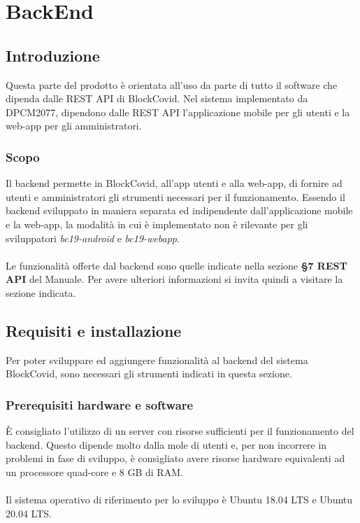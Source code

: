 \section{BackEnd}
\subsection{Introduzione}
Questa parte del prodotto è orientata all'uso da parte di tutto il software che dipenda dalle REST API di BlockCovid. Nel sistema implementato da DPCM2077, dipendono dalle REST API l'applicazione mobile per gli utenti e la web-app per gli amministratori.

\subsubsection{Scopo}
Il backend permette in BlockCovid, all'app utenti e alla web-app, di fornire ad utenti e amministratori gli strumenti necessari per il funzionamento. Essendo il backend sviluppato in maniera separata ed indipendente dall'applicazione mobile e la web-app, la modalità in cui è implementato non è rilevante per gli sviluppatori \textit{bc19-android} e \textit{bc19-webapp}.
\\
\\
Le funzionalità offerte dal backend sono quelle indicate nella sezione \textbf{§7 REST API} del Manuale. Per avere ulteriori informazioni si invita quindi a visitare la sezione indicata.


\subsection{Requisiti e installazione}
Per poter sviluppare ed aggiungere funzionalità al backend del sistema BlockCovid, sono necessari gli strumenti indicati in questa sezione.

\subsubsection{Prerequisiti hardware e software}
È consigliato l'utilizzo di un server con risorse sufficienti per il funzionamento del backend. Questo dipende molto dalla mole di utenti e, per non incorrere in problemi in fase di sviluppo, è consigliato avere risorse hardware equivalenti ad un processore quad-core e 8 GB di RAM.
\\\\
Il sistema operativo di riferimento per lo sviluppo è Ubuntu 18.04 LTS e Ubuntu 20.04 LTS.


